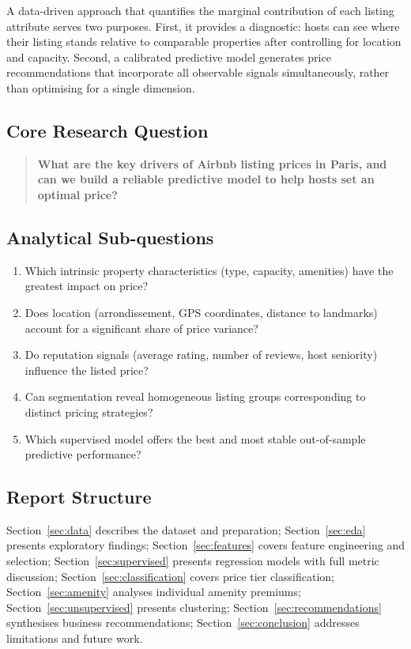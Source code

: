 \documentclass[12pt, a4paper]{article}
\begin{document}
A data-driven approach that quantifies the marginal contribution of each listing attribute serves two purposes. First, it provides a diagnostic: hosts can see where their listing stands relative to comparable properties after controlling for location and capacity. Second, a calibrated predictive model generates price recommendations that incorporate all observable signals simultaneously, rather than optimising for a single dimension.

\subsection{Core Research Question}

\begin{quote}
  \textbf{What are the key drivers of Airbnb listing prices in Paris, and can we build a reliable predictive model to help hosts set an optimal price?}
\end{quote}

\subsection{Analytical Sub-questions}

\begin{enumerate}[leftmargin=2em, itemsep=2pt]
  \item Which intrinsic property characteristics (type, capacity, amenities) have the greatest impact on price?
  \item Does location (arrondissement, GPS coordinates, distance to landmarks) account for a significant share of price variance?
  \item Do reputation signals (average rating, number of reviews, host seniority) influence the listed price?
  \item Can segmentation reveal homogeneous listing groups corresponding to distinct pricing strategies?
  \item Which supervised model offers the best and most stable out-of-sample predictive performance?
\end{enumerate}

\subsection{Report Structure}

Section~\ref{sec:data} describes the dataset and preparation; Section~\ref{sec:eda} presents exploratory findings; Section~\ref{sec:features} covers feature engineering and selection; Section~\ref{sec:supervised} presents regression models with full metric discussion; Section~\ref{sec:classification} covers price tier classification; Section~\ref{sec:amenity} analyses individual amenity premiums; Section~\ref{sec:unsupervised} presents clustering; Section~\ref{sec:recommendations} synthesises business recommendations; Section~\ref{sec:conclusion} addresses limitations and future work.
\end{document}

